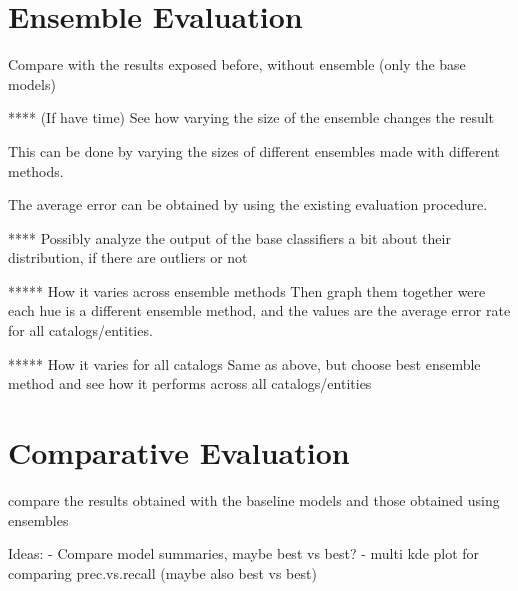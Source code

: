 \documentclass[epsfig,a4paper,11pt,titlepage,twoside,openany]{book}
\begin{document}


\section{Ensemble Evaluation}
\label{sec:ensemble-evaluation}


Compare with the results exposed before, without ensemble (only the base models)

**** (If have time) See how varying the size of the ensemble changes the result

This can be done by varying the sizes of different ensembles made with different
methods.

The average error can be obtained by using the existing evaluation procedure.

**** Possibly analyze the output of the base classifiers a bit about their
distribution, if there are outliers or not

***** How it varies across ensemble methods Then graph them together were each
hue is a different ensemble method, and the values are the average error rate
for all catalogs/entities.

***** How it varies for all catalogs Same as above, but choose best ensemble
method and see how it performs across all catalogs/entities


\section{Comparative Evaluation}
\label{sec:comparative-evaluation}

compare the results obtained with the baseline models and those obtained using ensembles

Ideas:
    - Compare model summaries, maybe best vs best? 
    - multi kde plot for comparing prec.vs.recall (maybe also best vs best)





\end{document}
